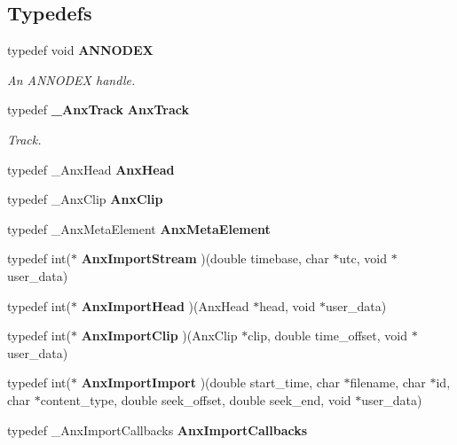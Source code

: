 \subsection*{Typedefs}
\begin{CompactItemize}
\item 
typedef void {\bf ANNODEX}\label{anx__types_8h_a0}

\begin{CompactList}\small\item\em An ANNODEX handle. \item\end{CompactList}\item 
typedef {\bf \_\-Anx\-Track} {\bf Anx\-Track}\label{anx__types_8h_a1}

\begin{CompactList}\small\item\em Track. \item\end{CompactList}\item 
typedef \_\-Anx\-Head {\bf Anx\-Head}\label{anx__types_8h_a2}

\item 
typedef \_\-Anx\-Clip {\bf Anx\-Clip}\label{anx__types_8h_a3}

\item 
typedef \_\-Anx\-Meta\-Element {\bf Anx\-Meta\-Element}\label{anx__types_8h_a4}

\item 
typedef int($\ast$ {\bf Anx\-Import\-Stream} )(double timebase, char $\ast$utc, void $\ast$user\_\-data)\label{anx__types_8h_a5}

\item 
typedef int($\ast$ {\bf Anx\-Import\-Head} )(Anx\-Head $\ast$head, void $\ast$user\_\-data)\label{anx__types_8h_a6}

\item 
typedef int($\ast$ {\bf Anx\-Import\-Clip} )(Anx\-Clip $\ast$clip, double time\_\-offset, void $\ast$user\_\-data)\label{anx__types_8h_a7}

\item 
typedef int($\ast$ {\bf Anx\-Import\-Import} )(double start\_\-time, char $\ast$filename, char $\ast$id, char $\ast$content\_\-type, double seek\_\-offset, double seek\_\-end, void $\ast$user\_\-data)\label{anx__types_8h_a8}

\item 
typedef \_\-Anx\-Import\-Callbacks {\bf Anx\-Import\-Callbacks}\label{anx__types_8h_a9}

\end{CompactItemize}
